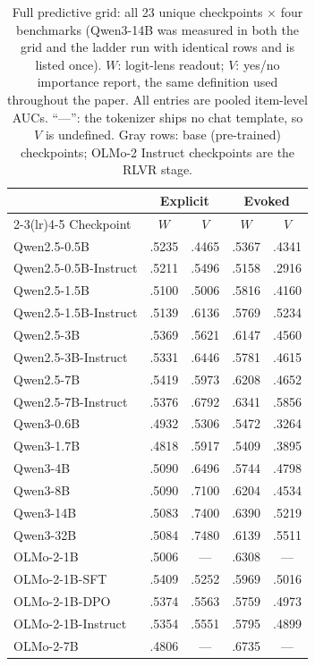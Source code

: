 \begin{table}[h]
\centering
\caption{Full predictive grid: all 23 unique checkpoints $\times$ four benchmarks (Qwen3-14B was measured in both the grid and the ladder run with identical rows and is listed once). $W$: logit-lens readout; $V$: yes/no importance report, the same definition used throughout the paper. All entries are pooled item-level AUCs. ``---'': the tokenizer ships no chat template, so $V$ is undefined. Gray rows: base (pre-trained) checkpoints; OLMo-2 Instruct checkpoints are the RLVR stage.}
\label{tab:appA1}
\scriptsize
\setlength{\tabcolsep}{4pt}
\begin{tabular}{l*{4}{c}}
\toprule
 & \multicolumn{2}{c}{Explicit} & \multicolumn{2}{c}{Evoked} \\
\cmidrule(lr){2-3}\cmidrule(lr){4-5}
Checkpoint & $W$ & $V$ & $W$ & $V$ \\
\midrule
{} Qwen2.5-0.5B & .5235 & .4465 & .5367 & .4341 \\
Qwen2.5-0.5B-Instruct & .5211 & .5496 & .5158 & .2916 \\
 Qwen2.5-1.5B & .5100 & .5006 & .5816 & .4160 \\
Qwen2.5-1.5B-Instruct & .5139 & .6136 & .5769 & .5234 \\
 Qwen2.5-3B & .5369 & .5621 & .6147 & .4560 \\
Qwen2.5-3B-Instruct & .5331 & .6446 & .5781 & .4615 \\
 Qwen2.5-7B & .5419 & .5973 & .6208 & .4652 \\
Qwen2.5-7B-Instruct & .5376 & .6792 & .6341 & .5856 \\
\addlinespace
Qwen3-0.6B & .4932 & .5306 & .5472 & .3264 \\
Qwen3-1.7B & .4818 & .5917 & .5409 & .3895 \\
Qwen3-4B & .5090 & .6496 & .5744 & .4798 \\
Qwen3-8B & .5090 & .7100 & .6204 & .4534 \\
Qwen3-14B & .5083 & .7400 & .6390 & .5219 \\
Qwen3-32B & .5084 & .7480 & .6139 & .5511 \\
\addlinespace
{} OLMo-2-1B & .5006 & --- & .6308 & --- \\
OLMo-2-1B-SFT & .5409 & .5252 & .5969 & .5016 \\
OLMo-2-1B-DPO & .5374 & .5563 & .5759 & .4973 \\
OLMo-2-1B-Instruct & .5354 & .5551 & .5795 & .4899 \\
 OLMo-2-7B & .4806 & --- & .6735 & --- \\

\end{tabular}
\end{table}
